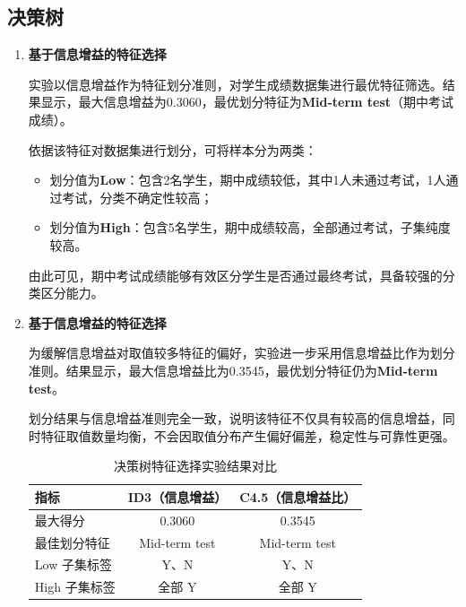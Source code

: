 \documentclass{../common/SCNU_Experimental_Report}
\begin{document}
\subsection{决策树}
\begin{enumerate}
    \item \textbf{基于信息增益的特征选择}

          实验以信息增益作为特征划分准则，对学生成绩数据集进行最优特征筛选。结果显示，最大信息增益为0.3060，最优划分特征为\textbf{Mid-term test}（期中考试成绩）。

          依据该特征对数据集进行划分，可将样本分为两类：
          \begin{itemize}
              \item 划分值为\textbf{Low}：包含2名学生，期中成绩较低，其中1人未通过考试，1人通过考试，分类不确定性较高；
              \item 划分值为\textbf{High}：包含5名学生，期中成绩较高，全部通过考试，子集纯度较高。
          \end{itemize}
          由此可见，期中考试成绩能够有效区分学生是否通过最终考试，具备较强的分类区分能力。

    \item \textbf{基于信息增益的特征选择}

          为缓解信息增益对取值较多特征的偏好，实验进一步采用信息增益比作为划分准则。结果显示，最大信息增益比为0.3545，最优划分特征仍为\textbf{Mid-term test}。

          划分结果与信息增益准则完全一致，说明该特征不仅具有较高的信息增益，同时特征取值数量均衡，不会因取值分布产生偏好偏差，稳定性与可靠性更强。
          \begin{table}[H]
              \centering
              \caption{决策树特征选择实验结果对比}
              \label{tab:dt_compare}
              \small
              \begin{tabular}{lcc}
                  \toprule
                  指标        & ID3（信息增益）     & C4.5（信息增益比）   \\
                  \midrule
                  最大得分      & 0.3060        & 0.3545        \\
                  最佳划分特征    & Mid-term test & Mid-term test \\
                  Low 子集标签  & Y、N           & Y、N           \\
                  High 子集标签 & 全部 Y          & 全部 Y          \\
                  \bottomrule
              \end{tabular}
          \end{table}
\end{enumerate}
\end{document}
